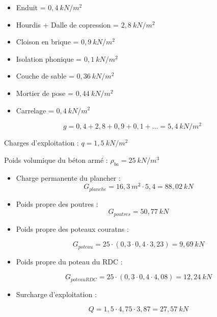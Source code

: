 \documentclass[12pt,a4paper]{article}
\begin{document}
		\begin{itemize}
		\item Enduit = $0,4~\unit{kN\per m^{2}}$
		\item Hourdis + Dalle de copression = $2,8~\unit{kN\per m^{2}}$
		\item Cloison en brique = $0,9~\unit{kN\per m^{2}}$
		\item Isolation phonique = $0,1~\unit{kN\per m^{2}}$
		\item Couche de sable = $0,36~\unit{kN\per m^{2}}$
		\item Mortier de pose = $0,44~\unit{kN\per m^{2}}$
		\item Carrelage = $0,4~\unit{kN\per m^{2}}$
	\end{itemize}
	
	\[ g = 0,4 + 2,8 + 0,9 + 0,1 +... = 5,4~\unit{kN\per m^{2}} \]
	
	Charges d'exploitation : $q = 1,5~\unit{kN\per m^{2}}$
	
	
	Poids volumique du béton armé : $\rho_{ba} = 25~\unit{kN\per m^{3}}$
	
	
	\vspace{2\baselineskip}
	
	
	
	
	\begin{itemize}
		\item Charge permanente du plancher :
		\[
		G_{planche} = 16,3~\unit{m^{2}} \cdot 5,4 = 88,02~\unit{kN}
		\]
		
		\item Poids propre des poutres : 
		\[
		G_{poutres} = 50,77~\unit{kN}
		\]
		
		\item Poids propre des poteaux couratns :
		
		\[
		G_{poteau} = 25 \cdot (0,3 \cdot 0,4 \cdot 3,23) = 9,69~\unit{kN}
		\]
		
		\item Poids propre du poteau du RDC :
		
		\[ G_{poteauRDC} = 25 \cdot (0,3 \cdot 0,4 \cdot 4,08) = 12,24~\unit{kN} \]
		
		\item Surcharge d'exploitation : 
		
		\[ Q = 1,5 \cdot 4,75 \cdot 3,87 = 27,57~\unit{kN} \]
	\end{itemize}
	
	\vspace{2\baselineskip}
	
	
	
\end{document}
